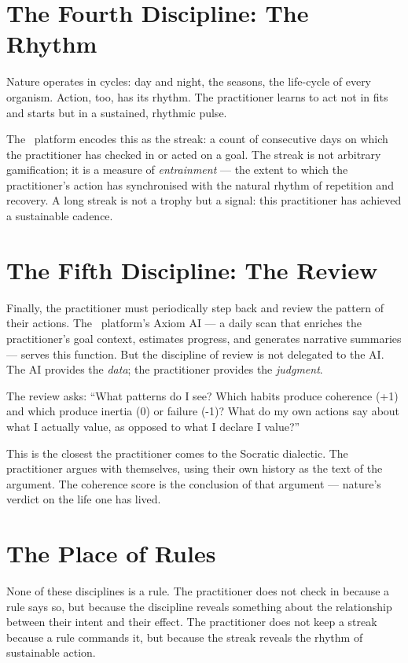 \section{The Fourth Discipline: The Rhythm}

Nature operates in cycles: day and night, the seasons, the life-cycle of every
organism. Action, too, has its rhythm. The practitioner learns to act not in
fits and starts but in a sustained, rhythmic pulse.

The \praxis\ platform encodes this as the streak: a count of consecutive days
on which the practitioner has checked in or acted on a goal. The streak is not
arbitrary gamification; it is a measure of \emph{entrainment} --- the extent to
which the practitioner's action has synchronised with the natural rhythm of
repetition and recovery. A long streak is not a trophy but a signal: this
practitioner has achieved a sustainable cadence.

\section{The Fifth Discipline: The Review}

Finally, the practitioner must periodically step back and review the pattern of
their actions. The \praxis\ platform's Axiom AI --- a daily scan that enriches
the practitioner's goal context, estimates progress, and generates narrative
summaries --- serves this function. But the discipline of review is not
delegated to the AI. The AI provides the \emph{data}; the practitioner provides
the \emph{judgment}.

The review asks: ``What patterns do I see? Which habits produce coherence (+1)
and which produce inertia (0) or failure (-1)? What do my own actions say about
what I actually value, as opposed to what I declare I value?''

This is the closest the practitioner comes to the Socratic dialectic. The
practitioner argues with themselves, using their own history as the text of the
argument. The coherence score is the conclusion of that argument --- nature's
verdict on the life one has lived.

\section{The Place of Rules}

None of these disciplines is a rule. The practitioner does not check in because
a rule says so, but because the discipline reveals something about the
relationship between their intent and their effect. The practitioner does not
keep a streak because a rule commands it, but because the streak reveals the
rhythm of sustainable action.

